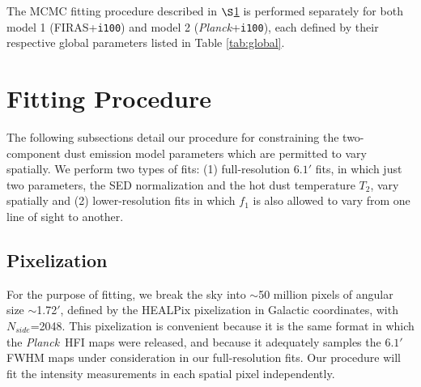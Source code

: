 \documentclass{emulateapj}
\newcommand{\PLANCK}{{\it Planck}}
\begin{document}

The MCMC fitting procedure described in $\S$\ref{sec:fitting} is performed
separately for both model 1 (FIRAS+\verb|i100|) and model 2 
(\PLANCK+\verb|i100|), each defined by their respective global parameters 
listed in Table \ref{tab:global}.




\section{Fitting Procedure}
\label{sec:fitting}

The following subsections detail our procedure for constraining the 
two-component dust emission model parameters which are permitted to vary
spatially. We perform two types of fits: (1) full-resolution 
$6.1'$ fits, in which just two parameters, the SED normalization and the hot 
dust temperature $T_2$, vary spatially and (2) lower-resolution fits in which 
$f_1$ is also allowed to vary from one line of sight to another.

\subsection{Pixelization}
\label{sec:pix}
For the purpose of fitting, we break the sky into $\sim$50 million pixels of 
angular size $\sim$1.72$'$, defined by the HEALPix pixelization in Galactic 
coordinates, with $N_{side}$=2048. This pixelization is convenient because it 
is the same format in which the \PLANCK~HFI maps were released, and because it 
adequately samples the $6.1'$ FWHM maps under consideration in our 
full-resolution fits. Our procedure will fit the intensity measurements in each
spatial pixel independently.
\end{document}
